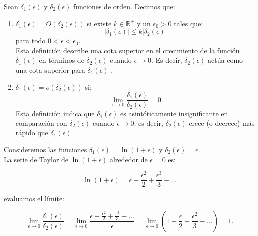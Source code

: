 \begin{definition}
	Sean $\delta_1\left(\epsilon\right)$ y $\delta_2\left(\epsilon\right)$ funciones de orden. Decimos que: 
	\begin{enumerate}
		\item $\delta_1\left(\epsilon\right)=O\left(\delta_2\left(\epsilon\right)\right)$ si existe $k\in\mathbb{R}^+$ y un $\epsilon_0>0$ tales que:
		\begin{equation}\label{eq: Big-O}
			|\delta_1\left(\epsilon\right)|\leq k|\delta_2\left(\epsilon\right)|
		\end{equation}
		para todo $0<\epsilon<\epsilon_0$.\\

		Esta definición describe una cota superior en el crecimiento de la función $\delta_1\left(\epsilon\right)$ en términos de $\delta_2\left(\epsilon\right)$ cuando $\epsilon\to0$. Es decir, $\delta_2(\epsilon)$ actúa como una cota superior para $\delta_1(\epsilon)$ \cite{bender2013advanced}.\\
		\item $\delta_1\left(\epsilon\right)=o(\delta_2\left(\epsilon\right))$ si:
		\begin{equation}\label{eq: small-o}
		\displaystyle\lim_{\epsilon\to0}\frac{\delta_1\left(\epsilon\right)}{\delta_2\left(\epsilon\right)}=0
		\end{equation}
		Esta definición indica que $\delta_1\left(\epsilon\right)$ es asintóticamente insignificante en comparación con $\delta_2\left(\epsilon\right)$ cuando $\epsilon\to0$; es decir, $\delta_2(\epsilon)$ crece (o decrece) más rápido que $\delta_1(\epsilon)$ \cite{bender2013advanced}.\\
	\end{enumerate}
\end{definition} 

Consideremos las funciones $\delta_1\left(\epsilon\right)=\ln\left(1+\epsilon\right)$ y $\delta_2\left(\epsilon\right)=\epsilon$.\\

La serie de Taylor de $\ln\left(1+\epsilon\right)$ alrededor de $\epsilon=0$ es:

$$\ln\left(1+\epsilon\right)=\epsilon-\frac{\epsilon^2}{2}+\frac{\epsilon^3}{3}-\dots$$

evaluamos el límite:

$$\displaystyle\lim_{\epsilon\to0}\frac{\delta_1\left(\epsilon\right)}{\delta_2\left(\epsilon\right)}=\lim_{\epsilon\to0}\frac{\epsilon-\frac{\epsilon^2}{2}+\frac{\epsilon^3}{3}-\dots}{\epsilon}=\lim_{\epsilon\to0}\left(1-\frac{\epsilon}{2}+\frac{\epsilon^2}{3}-\dots\right)=1.$$

